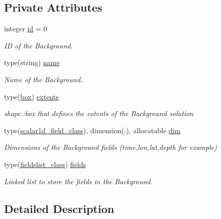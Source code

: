 \subsection*{Private Attributes}
\begin{DoxyCompactItemize}
\item 
integer \mbox{\hyperlink{structbackground__mod_1_1background__class_a1b3eabdda94ffdb97b6bb0db385edfd8}{id}} = 0
\begin{DoxyCompactList}\small\item\em ID of the Background. \end{DoxyCompactList}\item 
type(string) \mbox{\hyperlink{structbackground__mod_1_1background__class_a4f812fd2adfe5d1e50db63e75e460022}{name}}
\begin{DoxyCompactList}\small\item\em Name of the Background. \end{DoxyCompactList}\item 
type(\mbox{\hyperlink{structgeometry__mod_1_1box}{box}}) \mbox{\hyperlink{structbackground__mod_1_1background__class_acaaef54168dbee2731a99d0852844844}{extents}}
\begin{DoxyCompactList}\small\item\em shape\+::box that defines the extents of the Background solution \end{DoxyCompactList}\item 
type(\mbox{\hyperlink{structfield__types__mod_1_1scalar1d__field__class}{scalar1d\+\_\+field\+\_\+class}}), dimension(\+:), allocatable \mbox{\hyperlink{structbackground__mod_1_1background__class_a086f319ce4f039190699578d69927013}{dim}}
\begin{DoxyCompactList}\small\item\em Dimensions of the Background fields (time,lon,lat,depth for example) \end{DoxyCompactList}\item 
type(\mbox{\hyperlink{structbackground__mod_1_1fieldslist__class}{fieldslist\+\_\+class}}) \mbox{\hyperlink{structbackground__mod_1_1background__class_a68b750f0476dc75b886638a45a45f8f6}{fields}}
\begin{DoxyCompactList}\small\item\em Linked list to store the fields in the Background. \end{DoxyCompactList}\end{DoxyCompactItemize}


\subsection{Detailed Description}


